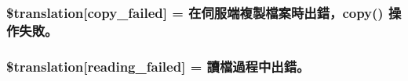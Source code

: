 \subsubsection[{\$translation}]{\setlength{\rightskip}{0pt plus 5cm}\$translation\mbox{[}\textquotesingle{}copy\+\_\+failed\textquotesingle{}\mbox{]} = \textquotesingle{}在伺服端複製檔案時出錯，copy() 操作失敗。\textquotesingle{}}\label{class_8upload_8zh___t_w_8php_a783c9358bcf54a054545b50098bc679b}
\hypertarget{class_8upload_8zh___t_w_8php_a01bea14c9fd5f353f62db44beabfcd42}{}
\subsubsection[{\$translation}]{\setlength{\rightskip}{0pt plus 5cm}\$translation\mbox{[}\textquotesingle{}reading\+\_\+failed\textquotesingle{}\mbox{]} = \textquotesingle{}讀檔過程中出錯。\textquotesingle{}}\label{class_8upload_8zh___t_w_8php_a01bea14c9fd5f353f62db44beabfcd42}
